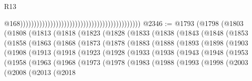 \begin{lexlean}{R13}
\begin{coremodule}
                                                                                            @168))))))))))))))))))))))))))))))))))))))))))))
@2346 := @1793
    (@1798
      (@1803
        (@1808
          (@1813
            (@1818
              (@1823
                (@1828
                  (@1833
                    (@1838
                      (@1843
                        (@1848
                          (@1853
                            (@1858
                              (@1863
                                (@1868
                                  (@1873
                                    (@1878
                                      (@1883
                                        (@1888
                                          (@1893
                                            (@1898
                                              (@1903
                                                (@1908
                                                  (@1913
                                                    (@1918
                                                      (@1923
                                                        (@1928
                                                          (@1933
                                                            (@1938
                                                              (@1943
                                                                (@1948
                                                                  (@1953
                                                                    (@1958
                                                                      (@1963
                                                                        (@1968
                                                                          (@1973
                                                                            (@1978
                                                                              (@1983
                                                                                (@1988
                                                                                  (@1993
                                                                                    (@1998
                                                                                      (@2003
                                                                                        (@2008
                                                                                          (@2013
                                                                                            (@2018

\end{coremodule}
\end{lexlean}
